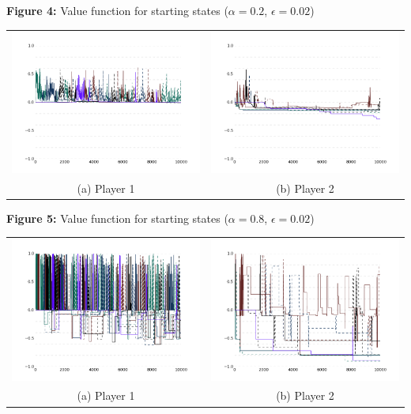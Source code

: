 \documentclass[fleqn]{article}
\begin{document}
\textbf{Figure 4:} Value function for starting states ($\alpha=0.2$, $\epsilon = 0.02$)
\begin{center}
	\begin{tabular}{cc}
		\includegraphics[width=70mm]{player1_0202.png} &   \includegraphics[width=70mm]{player2_0202.png} \\
		(a) Player 1  & (b) Player 2    \\[4pt]
	\end{tabular}
\end{center}

\textbf{Figure 5:} Value function for starting states ($\alpha=0.8$, $\epsilon = 0.02$)
\begin{center}
	\begin{tabular}{cc}
		\includegraphics[width=70mm]{player1_0802.png} &   \includegraphics[width=70mm]{player2_0802.png} \\
		(a) Player 1  & (b)  Player 2  \\[4pt]
	\end{tabular}
\end{center}
\end{document}
